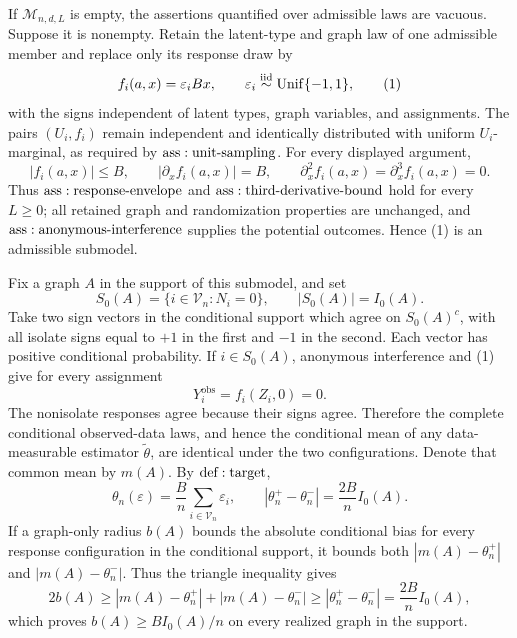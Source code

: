 If \(\mathcal M_{n,d,L}\) is empty, the assertions quantified over admissible laws are vacuous.  Suppose it is nonempty.  Retain the latent-type and graph law of one admissible member and replace only its response draw by
\[
 f_i(a,x)=\varepsilon_iBx,
 \qquad \varepsilon_i\overset{\mathrm{iid}}{\sim}{\rm Unif}\{-1,1\},
\tag{1}
\]
with the signs independent of latent types, graph variables, and assignments.  The pairs \((U_i,f_i)\) remain independent and identically distributed with uniform \(U_i\)-marginal, as required by \({\rm ass:unit\text{-}sampling}\).  For every displayed argument,
\[
 |f_i(a,x)|\leq B,
 \qquad |\partial_xf_i(a,x)|=B,
 \qquad \partial_x^2f_i(a,x)=\partial_x^3f_i(a,x)=0.
\tag{2}
\]
Thus \({\rm ass:response\text{-}envelope}\) and \({\rm ass:third\text{-}derivative\text{-}bound}\) hold for every \(L\geq0\); all retained graph and randomization properties are unchanged, and \({\rm ass:anonymous\text{-}interference}\) supplies the potential outcomes.  Hence (1) is an admissible submodel.

Fix a graph \(A\) in the support of this submodel, and set
\[
 S_0(A)=\{i\in\mathcal V_n:N_i=0\},
 \qquad |S_0(A)|=I_0(A).
\tag{3}
\]
Take two sign vectors in the conditional support which agree on \(S_0(A)^c\), with all isolate signs equal to \(+1\) in the first and \(-1\) in the second.  Each vector has positive conditional probability.  If \(i\in S_0(A)\), anonymous interference and (1) give for every assignment
\[
 Y_i^{\mathrm{obs}}=f_i(Z_i,0)=0.
\tag{4}
\]
The nonisolate responses agree because their signs agree.  Therefore the complete conditional observed-data laws, and hence the conditional mean of any data-measurable estimator \(\widetilde\theta\), are identical under the two configurations.  Denote that common mean by \(m(A)\).  By \({\rm def:target}\),
\[
 \theta_n(\varepsilon)=\frac Bn\sum_{i\in\mathcal V_n}\varepsilon_i,
 \qquad |\theta_n^+-\theta_n^-|=\frac{2B}{n}I_0(A).
\tag{5}
\]
If a graph-only radius \(b(A)\) bounds the absolute conditional bias for every response configuration in the conditional support, it bounds both \(|m(A)-\theta_n^+|\) and \(|m(A)-\theta_n^-|\).  Thus the triangle inequality gives
\[
 2b(A)\geq|m(A)-\theta_n^+|+|m(A)-\theta_n^-|
 \geq|\theta_n^+-\theta_n^-|=\frac{2B}{n}I_0(A),
\]
which proves \(b(A)\geq BI_0(A)/n\) on every realized graph in the support.

